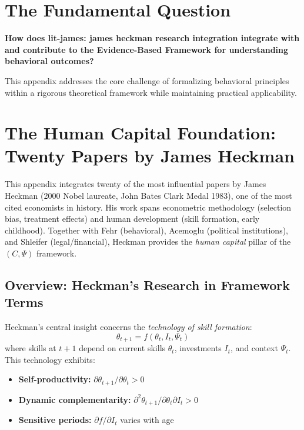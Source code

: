 \section{The Fundamental Question}
\label{sec:hec-fundamental}

\begin{tcolorbox}[
    colback=red!5!white,
    colframe=red!75!black,
    title={\textbf{Fundamental Question}}
]
\textbf{How does lit-james: james heckman research integration integrate with and contribute to the
Evidence-Based Framework for understanding behavioral outcomes?}

This appendix addresses the core challenge of formalizing behavioral principles
within a rigorous theoretical framework while maintaining practical applicability.
\end{tcolorbox}




\section{The Human Capital Foundation: Twenty Papers by James Heckman}
\label{app:heckman}

This appendix integrates twenty of the most influential papers by James Heckman
(2000 Nobel laureate, John Bates Clark Medal 1983), one of the most cited
economists in history. His work spans econometric methodology (selection bias,
treatment effects) and human development (skill formation, early childhood).
Together with Fehr (behavioral), Acemoglu (political institutions), and
Shleifer (legal/financial), Heckman provides the \emph{human capital} pillar
of the $(C, \Psi)$ framework.

\subsection{Overview: Heckman's Research in Framework Terms}

Heckman's central insight concerns the \emph{technology of skill formation}:
\begin{equation}
  \theta_{t+1} = f(\theta_t, I_t, \Psi_t)
\end{equation}
where skills at $t+1$ depend on current skills $\theta_t$, investments $I_t$,
and context $\Psi_t$. This technology exhibits:
\begin{itemize}
  \item \textbf{Self-productivity:} $\partial\theta_{t+1}/\partial\theta_t > 0$
  \item \textbf{Dynamic complementarity:} $\partial^2\theta_{t+1}/\partial\theta_t\partial I_t > 0$
  \item \textbf{Sensitive periods:} $\partial f/\partial I_t$ varies with age
\end{itemize}

